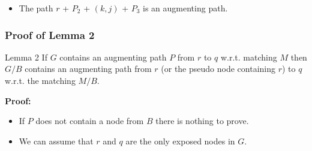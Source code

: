 \documentclass[hyperref={pdfpagelabels=false}]{beamer}
\begin{document}
{\begin{center}
	\end{center}
	
	\begin{itemize}
		\item The path $r$ + $P_{2}$ + $(k,j)$ + $P_{3}$ is an augmenting path.
	\end{itemize}
}

\frame
{
	\frametitle{Proof of Lemma 2}
	
	\begin{block}{Lemma 2}
	If $G$ contains an augmenting path $P$ from $r$ to $q$ w.r.t. matching $M$ then $G/B$ contains an augmenting path from $r$ (or the pseudo node containing $r$) to $q$ w.r.t. the matching $M/B$.
	\end{block}
	
	\textbf{Proof:}
	
	\bigskip
	
	\begin{itemize}
		\item If $P$ does not contain a node from $B$ there is nothing to prove.
		\item We can assume that $r$ and $q$ are the only exposed nodes in $G$.
	\end{itemize}
}
\end{document}
